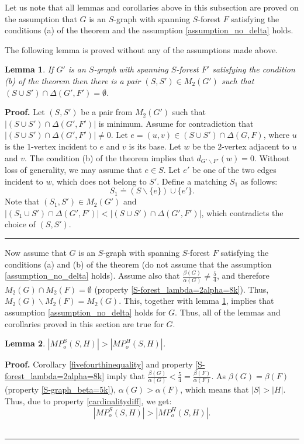 \documentclass[a4paper, 12pt]{article}
\newtheorem{lemma}{Lemma}[subsection]
\newenvironment{proof}[1][Proof]{\noindent\textbf{#1.} }{\ \rule{0.5em}{0.5em}}
\begin{document}
\bigskip

Let us note that all lemmas and corollaries above in this subsection
are proved on the assumption that $G$ is an $S$-graph with spanning
$S$-forest $F$ satisfying the conditions (a) of the theorem and the
assumption \ref{assumption_no_delta} holds.

\bigskip

The following lemma is proved without any of the assumptions made
above.
\begin{lemma} \label{no_delta}
If $G'$ is an $S$-graph with spanning $S$-forest $F'$ satisfying the
condition (b) of the theorem then there is a pair $(S,S') \in
M_2(G')$ such that $(S \cup S') \cap \Delta(G', F') = \emptyset$.
\end{lemma}
\begin{proof}
Let $(S, S')$ be a pair from $M_2(G')$ such that $|(S \cup S') \cap
\Delta(G', F')|$ is minimum. Assume for contradiction that $|(S \cup
S') \cap \Delta(G', F')| \neq 0$. Let $e = (u, v) \in (S \cup S')
\cap \Delta(G, F)$, where $u$ is the $1$-vertex incident to $e$ and
$v$ is its base. Let $w$ be the $2$-vertex adjacent to $u$ and $v$.
The condition (b) of the theorem implies that $d_{G' \backslash
F'}(w) = 0$. Without loss of generality, we may assume that $e \in
S$. Let $e'$ be one of the two edges incident to $w$, which does not
belong to $S'$. Define a matching $S_1$ as follows:
$$S_1 \doteq (S \backslash \{ e \}) \cup \{e'\}.$$
Note that $(S_1, S') \in M_2(G')$ and $|(S_1 \cup S') \cap
\Delta(G', F')| < |(S \cup S') \cap \Delta(G', F')|$, which
contradicts the choice of $(S, S')$.
\end{proof}

\bigskip

Now assume that $G$ is an $S$-graph with spanning $S$-forest $F$
satisfying the conditions (a) and (b) of the theorem (do not assume
that the assumption \ref{assumption_no_delta} holds). Assume also
that $\frac{\beta(G)}{\alpha(G)} \neq \frac{5}{4}$, and therefore
$M_2(G) \cap M_2(F) = \emptyset$ (property
\ref{S-forest_lambda=2alpha=8k}). Thus, $M_2(G) \backslash M_2(F) =
M_2(G)$. This, together with lemma \ref{no_delta}, implies that
assumption \ref{assumption_no_delta} holds for $G$. Thus, all of the
lemmas and corollaries proved in this section are true for $G$.

\begin{lemma} \label{MP^S>MP^H}
$|MP_o^S(S,H)| > |MP_o^H(S,H)|$.
\end{lemma}
\begin{proof}
Corollary \ref{fivefourthinequality} and property
\ref{S-forest_lambda=2alpha=8k} imply that
$\frac{\beta(G)}{\alpha(G)} < \frac{5}{4} =
\frac{\beta(F)}{\alpha(F)}$. As $\beta(G) = \beta(F)$ (property
\ref{S-graph_beta=5k}), $\alpha(G) > \alpha(F)$, which means that
$|S| > |H|$. Thus, due to property \ref{cardinalitydiff}, we get:
$$|MP_o^S(S,H)| > |MP_o^H(S,H)|.$$
\end{proof}
\end{document}
